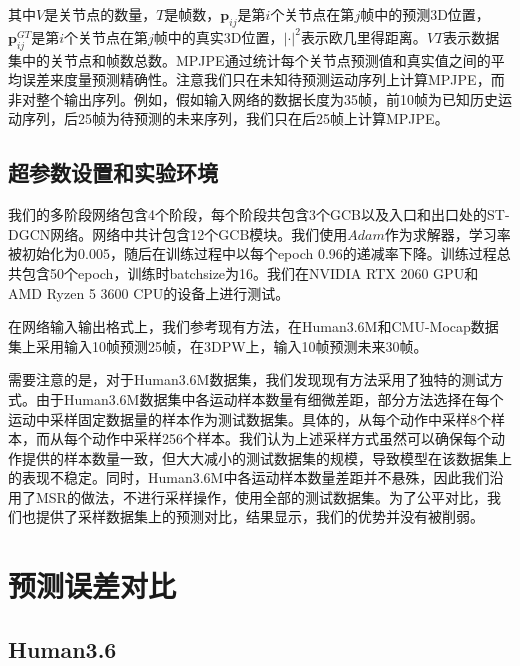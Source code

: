 其中$V$是关节点的数量，$T$是帧数，$\mathbf{p}_{ij}$是第$i$个关节点在第$j$帧中的预测3D位置，$\mathbf{p}^{GT}_{ij}$是第$i$个关节点在第$j$帧中的真实3D位置，$|\cdot|^2$表示欧几里得距离。$VT$表示数据集中的关节点和帧数总数。MPJPE通过统计每个关节点预测值和真实值之间的平均误差来度量预测精确性。注意我们只在未知待预测运动序列上计算MPJPE，而非对整个输出序列。例如，假如输入网络的数据长度为35帧，前10帧为已知历史运动序列，后25帧为待预测的未来序列，我们只在后25帧上计算MPJPE。

\subsection{超参数设置和实验环境}
我们的多阶段网络包含4个阶段，每个阶段共包含3个GCB以及入口和出口处的ST-DGCN网络。网络中共计包含12个GCB模块。我们使用$Adam$作为求解器，学习率被初始化为0.005，随后在训练过程中以每个epoch 0.96的递减率下降。训练过程总共包含50个epoch，训练时batchsize为16。我们在NVIDIA RTX 2060 GPU和AMD Ryzen 5 3600 CPU的设备上进行测试。

在网络输入输出格式上，我们参考现有方法，在Human3.6M和CMU-Mocap数据集上采用输入10帧预测25帧，在3DPW上，输入10帧预测未来30帧。

需要注意的是，对于Human3.6M数据集，我们发现现有方法采用了独特的测试方式。由于Human3.6M数据集中各运动样本数量有细微差距，部分方法选择在每个运动中采样固定数据量的样本作为测试数据集。具体的，\parencite{li2020dynamic, mao2019learning, martinez2017human}从每个动作中采样8个样本，而\parencite{mao2020history}从每个动作中采样256个样本。我们认为上述采样方式虽然可以确保每个动作提供的样本数量一致，但大大减小的测试数据集的规模，导致模型在该数据集上的表现不稳定。同时，Human3.6M中各运动样本数量差距并不悬殊，因此我们沿用了MSR\parencite{dang2021msr}的做法，不进行采样操作，使用全部的测试数据集。为了公平对比，我们也提供了采样数据集上的预测对比，结果显示，我们的优势并没有被削弱。



\section{预测误差对比}
\subsection{Human3.6}

